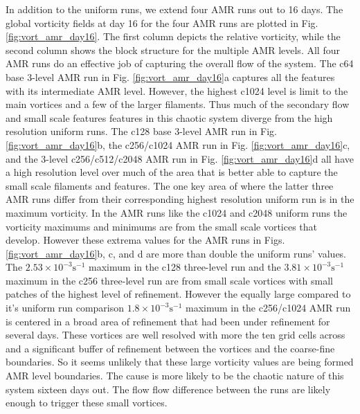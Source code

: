 In addition to the uniform runs, we extend four AMR runs out to 16 days. 
The global vorticity fields at day 16 for the four AMR runs are plotted in 
Fig. \ref{fig:vort_amr_day16}. The first column depicts the relative vorticity,
while the second column shows the block structure for the multiple AMR levels.
All four AMR runs do an effective job of capturing the overall flow of the system.
The c64 base 3-level AMR run in Fig. \ref{fig:vort_amr_day16}a captures all the features
with its intermediate AMR level. However, the highest c1024 level is limit to the main vortices
and a few of the larger filaments. Thus much of the secondary flow and small scale features 
features in this chaotic system diverge from the high resolution uniform runs. The c128 base
3-level AMR run in Fig. \ref{fig:vort_amr_day16}b, the c256/c1024 AMR run in Fig. 
\ref{fig:vort_amr_day16}c, and the 3-level c256/c512/c2048 AMR run in Fig.
\ref{fig:vort_amr_day16}d all have a high resolution level over much of the area that
is better able to capture the small scale filaments and features. The one key area of
where the latter three AMR runs differ from their corresponding highest resolution
uniform run is in the maximum vorticity. In the AMR runs like the c1024 and c2048 
uniform runs the vorticity maximums and minimums are from the small scale vortices
that develop. However these extrema values for the AMR runs in Figs. 
\ref{fig:vort_amr_day16}b, c, and d are more than double the uniform runs' values.
The $2.53 \times 10^{-3}\mathrm{s}^{-1}$ maximum in the c128 three-level run and
the $3.81 \times 10^{-3}\mathrm{s}^{-1}$ maximum in the c256 three-level run are
from small scale vortices with small patches of the highest level of refinement.  However
the equally large compared to it's uniform run comparison 
$1.8 \times 10^{-3}\mathrm{s}^{-1}$ maximum in the c256/c1024 AMR run is centered
in a broad area of refinement that had been under refinement for several days. These vortices
are well resolved with more the ten grid cells across and a significant buffer of refinement between the
vortices and the coarse-fine boundaries. So it
seems unlikely that these large vorticity values are being formed AMR level boundaries.
The cause is more likely to be the chaotic nature of this system sixteen days out. The flow
flow difference between the runs are likely enough to trigger these small vortices.

